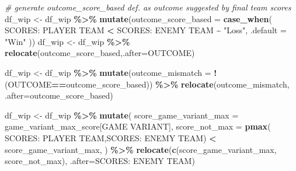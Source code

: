 \documentclass[
]{article}
\newenvironment{Shaded}{\begin{snugshade}}{\end{snugshade}}
\newcommand{\AttributeTok}[1]{\textcolor[rgb]{0.13,0.29,0.53}{#1}}
\newcommand{\CommentTok}[1]{\textcolor[rgb]{0.56,0.35,0.01}{\textit{#1}}}
\newcommand{\FunctionTok}[1]{\textcolor[rgb]{0.13,0.29,0.53}{\textbf{#1}}}
\newcommand{\NormalTok}[1]{#1}
\newcommand{\OtherTok}[1]{\textcolor[rgb]{0.56,0.35,0.01}{#1}}
\newcommand{\SpecialCharTok}[1]{\textcolor[rgb]{0.81,0.36,0.00}{\textbf{#1}}}
\newcommand{\StringTok}[1]{\textcolor[rgb]{0.31,0.60,0.02}{#1}}
\begin{document}
\begin{Shaded}
\begin{Highlighting}[]
\CommentTok{\# generate outcome\_score\_based def. as outcome suggested by final team scores}
\NormalTok{df\_wip }\OtherTok{\textless{}{-}}\NormalTok{ df\_wip }\SpecialCharTok{\%\textgreater{}\%}
  \FunctionTok{mutate}\NormalTok{(}\AttributeTok{outcome\_score\_based =} \FunctionTok{case\_when}\NormalTok{(}
    \StringTok{\textasciigrave{}}\AttributeTok{SCORES: PLAYER TEAM}\StringTok{\textasciigrave{}} \SpecialCharTok{\textless{}} \StringTok{\textasciigrave{}}\AttributeTok{SCORES: ENEMY TEAM}\StringTok{\textasciigrave{}} \SpecialCharTok{\textasciitilde{}} \StringTok{"Loss"}\NormalTok{, }\AttributeTok{.default =} \StringTok{"Win"}
\NormalTok{  ))}
\NormalTok{df\_wip }\OtherTok{\textless{}{-}}\NormalTok{ df\_wip }\SpecialCharTok{\%\textgreater{}\%} \FunctionTok{relocate}\NormalTok{(outcome\_score\_based,}\AttributeTok{.after=}\NormalTok{OUTCOME)}

\NormalTok{df\_wip }\OtherTok{\textless{}{-}}\NormalTok{ df\_wip }\SpecialCharTok{\%\textgreater{}\%} 
  \FunctionTok{mutate}\NormalTok{(}\AttributeTok{outcome\_mismatch =} \SpecialCharTok{!}\NormalTok{(OUTCOME}\SpecialCharTok{==}\NormalTok{outcome\_score\_based)) }\SpecialCharTok{\%\textgreater{}\%} 
  \FunctionTok{relocate}\NormalTok{(outcome\_mismatch, }\AttributeTok{.after=}\NormalTok{outcome\_score\_based)}

\NormalTok{df\_wip }\OtherTok{\textless{}{-}}\NormalTok{ df\_wip }\SpecialCharTok{\%\textgreater{}\%} 
  \FunctionTok{mutate}\NormalTok{(}
    \AttributeTok{score\_game\_variant\_max =}\NormalTok{ game\_variant\_max\_score[}\StringTok{\textasciigrave{}}\AttributeTok{GAME VARIANT}\StringTok{\textasciigrave{}}\NormalTok{],}
    \AttributeTok{score\_not\_max =} \FunctionTok{pmax}\NormalTok{(}
      \StringTok{\textasciigrave{}}\AttributeTok{SCORES: PLAYER TEAM}\StringTok{\textasciigrave{}}\NormalTok{,}\StringTok{\textasciigrave{}}\AttributeTok{SCORES: ENEMY TEAM}\StringTok{\textasciigrave{}}\NormalTok{) }\SpecialCharTok{\textless{}}\NormalTok{ score\_game\_variant\_max,}
\NormalTok{    ) }\SpecialCharTok{\%\textgreater{}\%}
  \FunctionTok{relocate}\NormalTok{(}\FunctionTok{c}\NormalTok{(score\_game\_variant\_max, score\_not\_max), }\AttributeTok{.after=}\StringTok{\textasciigrave{}}\AttributeTok{SCORES: ENEMY TEAM}\StringTok{\textasciigrave{}}\NormalTok{)}


\end{Highlighting}
\end{Shaded}
\end{document}
